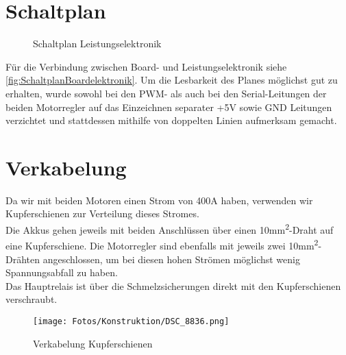 \section{Schaltplan}
\begin{figure}[H]
    
    \caption{Schaltplan Leistungselektronik\label{fig:schaltLeistung}}
\end{figure}
Für die Verbindung zwischen Board- und Leistungselektronik siehe \autoref{fig:SchaltplanBoardelektronik}.
Um die Lesbarkeit des Planes möglichst gut zu erhalten, wurde sowohl bei den PWM- als auch bei den Serial-Leitungen der beiden Motorregler auf das Einzeichnen separater +5V sowie GND Leitungen verzichtet und stattdessen mithilfe von doppelten Linien aufmerksam gemacht.

\clearpage
\section{Verkabelung}
Da wir mit beiden Motoren einen Strom von 400A haben, verwenden wir Kupferschienen zur Verteilung dieses Stromes.\\
Die Akkus gehen jeweils mit beiden Anschlüssen über einen 10mm\textsuperscript{2}-Draht auf eine Kupferschiene. Die Motorregler sind ebenfalls mit jeweils zwei 10mm\textsuperscript{2}-Drähten angeschlossen, um bei diesen hohen Strömen möglichst wenig Spannungsabfall zu haben.\\
Das Hauptrelais ist über die Schmelzsicherungen direkt mit den Kupferschienen verschraubt.
\begin{figure}[H]
    \texttt{[image: Fotos/Konstruktion/DSC\_8836.png]}
    \caption{Verkabelung Kupferschienen}
\end{figure}


\clearpage